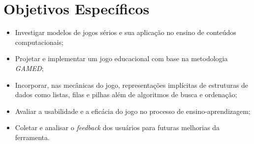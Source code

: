 \section{Objetivos Específicos}


\begin{itemize}
  \item Investigar modelos de jogos sérios e sua aplicação no ensino de conteúdos computacionais;
  \item Projetar e implementar um jogo educacional com base na metodologia \emph{GAMED};
  \item Incorporar, nas mecânicas do jogo, representações implícitas de estruturas de dados como listas, filas e pilhas além de algoritmos de busca e ordenação;
  \item Avaliar a usabilidade e a eficácia do jogo no processo de ensino-aprendizagem;
  \item Coletar e analisar o \emph{feedback} dos usuários para futuras melhorias da ferramenta.
\end{itemize}
